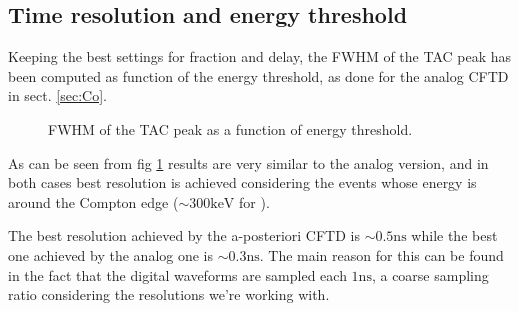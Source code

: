 \documentclass[11pt,a4 paper]{article}
\begin{document}
\subsection{Time resolution and energy threshold}
Keeping the best settings for fraction and delay, the FWHM of the TAC peak has been computed as function of the energy threshold, as done for the analog CFTD in sect. \ref{sec:Co}.

\begin{figure}[H]
    \centering
    \caption{FWHM of the TAC peak as a function of energy threshold.}
    \label{fig:FWHM:sim}
\end{figure}

As can be seen from fig \ref{fig:FWHM:sim} results are very similar to the analog version, and in both cases best resolution is achieved considering the events whose energy is around the Compton edge ($\sim 300\si{\kilo\electronvolt}$ for ).

The best resolution achieved by the a-posteriori CFTD is $\sim0.5\si{\nano\second}$ while the best one achieved by the analog one is $\sim0.3\si{\nano\second}$. The main reason for this can be found in the fact that the digital waveforms are sampled each $1\si{\nano\second}$, a coarse sampling ratio considering the resolutions we're working with.


\end{document}
